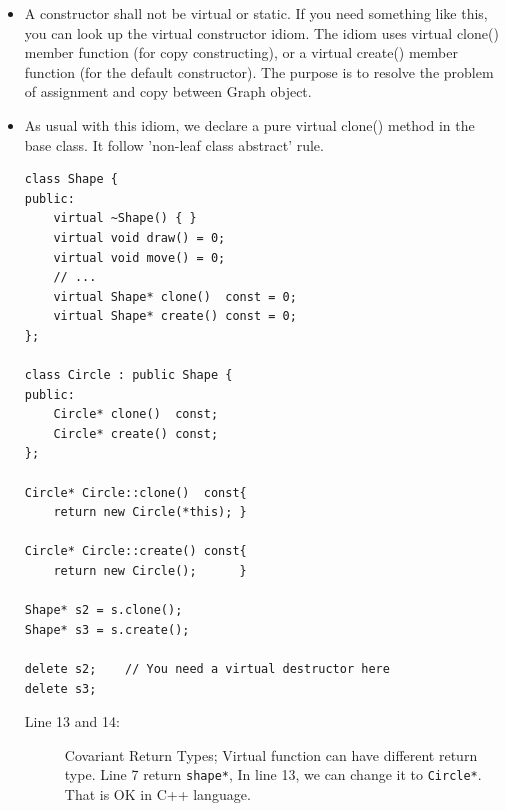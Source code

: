\documentclass[a4paper,11pt,twoside]{book}
\begin{document}
\begin{itemize}
	\item A constructor shall not be virtual or static. If you need something like this, you can look up the virtual constructor idiom. The idiom uses virtual clone() member function (for copy constructing), or a virtual create() member function (for the default constructor). The purpose is to resolve the problem of assignment and copy between Graph object.
	
	\item As usual with this idiom, we declare a pure virtual clone() method in the base class. It follow 'non-leaf class abstract' rule.
	
\begin{lstlisting}
class Shape {
public:
	virtual ~Shape() { }                 
	virtual void draw() = 0;           
	virtual void move() = 0;
	// ...
	virtual Shape* clone()  const = 0;   
	virtual Shape* create() const = 0; 
};
	
class Circle : public Shape {
public:
	Circle* clone()  const;  
	Circle* create() const;   
};

Circle* Circle::clone()  const{
	return new Circle(*this); }
	
Circle* Circle::create() const{
	return new Circle();      }
	
Shape* s2 = s.clone();
Shape* s3 = s.create();
	
delete s2;    // You need a virtual destructor here
delete s3;
\end{lstlisting}
	\begin{description}
		\item[Line 13 and 14:] Covariant Return Types; Virtual function can have different return type. Line 7 return \texttt{shape*}, In line 13, we can change it to \texttt{Circle*}. That is OK in C++ language.
	\end{description}


\end{itemize}
\end{document}
